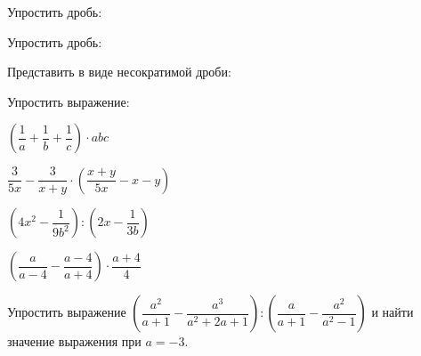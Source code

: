 \begin{listofex}
	\item Упростить дробь:
	\begin{enumcols}[itemcolumns=3]
		\item {}
		\item {}
		\item {}
	\end{enumcols}
	\item Упростить дробь:
	\begin{enumcols}[itemcolumns=3]
		\item {}
		\item {}
		\item {}
		\item {}
		\item {}
	\end{enumcols}
	\item {}
	\item Представить в виде несократимой дроби:
	\begin{enumcols}[itemcolumns=3]
		\item {}
		\item {}
		\item {}
	\end{enumcols}
	\item Упростить выражение:
	\begin{enumcols}[itemcolumns=2]
		\item \( \left( \dfrac{1}{a}+\dfrac{1}{b}+\dfrac{1}{c} \right)\cdot abc \)
		\item \( \dfrac{3}{5x}-\dfrac{3}{x+y}\cdot\left( \dfrac{x+y}{5x}-x-y \right) \)
		\item \( \left( 4x^2-\dfrac{1}{9b^2} \right):\left( 2x-\dfrac{1}{3b} \right) \)
		\item \( \left( \dfrac{a}{a-4}-\dfrac{a-4}{a+4} \right)\cdot\dfrac{a+4}{4} \)
	\end{enumcols}
	\item Упростить выражение \( \left( \dfrac{a^2}{a+1}-\dfrac{a^3}{a^2+2a+1} \right):\left( \dfrac{a}{a+1}-\dfrac{a^2}{a^2-1} \right) \) и найти значение выражения при \( a=-3 \).
\end{listofex}